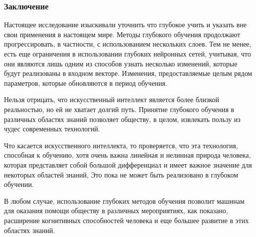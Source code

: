 \begin{frame}
    \frametitle{Заключение}

    Настоящее исследование изыскивали уточнить что глубокое учить и указать вне свои применения в настоящем мире.
    Методы глубокого обучения продолжают прогрессировать, в частности, с использованием нескольких слоев.
    Тем не менее, есть еще ограничения в использовании глубоких нейронных сетей, учитывая,
    что они являются лишь одним из способов узнать несколько изменений, которые будут реализованы в входном векторе.
    Изменения, предоставляемые целым рядом параметров, которые обновляются в период обучения.

    Нельзя отрицать, что искусственный интеллект является более близкой реальностью, но ей не хватает долгий путь.
    Принятие глубокого обучения в различных областях знаний позволяет обществу, в целом, извлекать пользу из чудес современных технологий.

    Что касается искусственного интеллекта, то проверяется, что эта технология, способная к обучению, хотя очень важна линейная и нелинная природа человека,
    которая представляет собой большой дифференциал и имеет важное значение для некоторых областей знаний, Это пока не может быть реализовано в глубоком обучении.

    В любом случае, использование глубоких методов обучения позволит машинам для оказания помощи обществу в различных мероприятиях,
    как показано, расширение когнитивных способностей человека и еще большее развитие в этих областях знаний.

\end{frame}